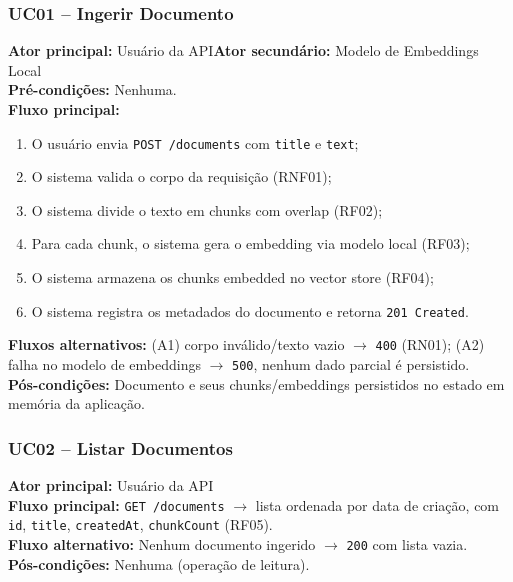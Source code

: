 \documentclass[11pt,a4paper]{article}
\begin{document}
\subsubsection{UC01 -- Ingerir Documento}
\textbf{Ator principal:} Usuário da API\quad\textbf{Ator secundário:} Modelo de
Embeddings Local\\
\textbf{Pré-condições:} Nenhuma.\\
\textbf{Fluxo principal:}
\begin{enumerate}[leftmargin=1.2cm]
    \item O usuário envia \texttt{POST /documents} com \texttt{title} e \texttt{text};
    \item O sistema valida o corpo da requisição (RNF01);
    \item O sistema divide o texto em chunks com overlap (RF02);
    \item Para cada chunk, o sistema gera o embedding via modelo local (RF03);
    \item O sistema armazena os chunks embedded no vector store (RF04);
    \item O sistema registra os metadados do documento e retorna \texttt{201 Created}.
\end{enumerate}
\textbf{Fluxos alternativos:} (A1) corpo inválido/texto vazio $\rightarrow$
\texttt{400} (RN01); (A2) falha no modelo de embeddings $\rightarrow$ \texttt{500},
nenhum dado parcial é persistido.\\
\textbf{Pós-condições:} Documento e seus chunks/embeddings persistidos no estado em
memória da aplicação.

\subsubsection{UC02 -- Listar Documentos}
\textbf{Ator principal:} Usuário da API\\
\textbf{Fluxo principal:} \texttt{GET /documents} $\rightarrow$ lista ordenada por
data de criação, com \texttt{id}, \texttt{title}, \texttt{createdAt},
\texttt{chunkCount} (RF05).\\
\textbf{Fluxo alternativo:} Nenhum documento ingerido $\rightarrow$ \texttt{200} com
lista vazia.\\
\textbf{Pós-condições:} Nenhuma (operação de leitura).
\end{document}
